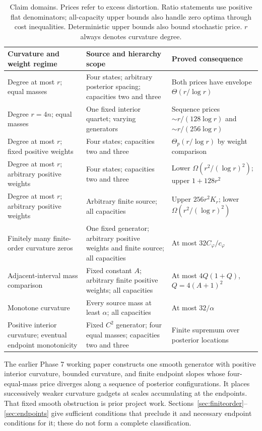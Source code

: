 \documentclass[11pt]{article}
\theoremstyle{definition}\newtheorem{definition}[theorem]{Definition}
\theoremstyle{remark}\newtheorem{remark}[theorem]{Remark}
\begin{document}
\begin{table}[ht]
\centering\small
\begin{tabular}{@{}>{\raggedright\arraybackslash}p{}>{\raggedright\arraybackslash}p{}>{\raggedright\arraybackslash}p{}@{}}
\toprule
Curvature and weight regime & Source and hierarchy scope & Proved consequence \\
\midrule
Degree at most $r$; equal masses & Four states; arbitrary posterior spacing; capacities two and three & Both prices have envelope $\Theta(r/\log r)$ \\
Degree $r=4n$; equal masses & One fixed interior quartet; varying generators & Sequence prices $\sim r/(128\log r)$ and $\sim r/(256\log r)$ \\
Degree at most $r$; fixed positive weights & Four states; capacities two and three & $\Theta_p(r/\log r)$ by weight comparison \\
Degree at most $r$; arbitrary positive weights & Four states; capacities two and three & Lower $\Omega(r^2/(\log r)^2)$; upper $1+128r^2$ \\
Degree at most $r$; arbitrary positive weights & Arbitrary finite source; all capacities & Upper $256r^2K_r$; lower $\Omega(r^2/(\log r)^2)$ \\
Finitely many finite-order curvature zeros & One fixed generator; arbitrary positive weights and finite source; all capacities & At most $32C_\varphi/c_\varphi$ \\
Adjacent-interval mass comparison & Fixed constant $A$; arbitrary finite positive weights; all capacities & At most $4Q(1+Q)$, $Q=4(A+1)^2$ \\
Monotone curvature & Every source mass at least $\alpha$; all capacities & At most $32/\alpha$ \\
Positive interior curvature; eventual endpoint monotonicity & Fixed $C^2$ generator; four equal masses; capacities two and three & Finite supremum over posterior locations \\
\bottomrule
\end{tabular}
\caption{Claim domains. Prices refer to excess distortion. Ratio statements use positive flat denominators; all-capacity upper bounds also handle zero optima through cost inequalities. Deterministic upper bounds also bound stochastic price. $r$ always denotes curvature degree.}
\label{tab:scope}
\end{table}

The earlier Phase 7 working paper \cite[Section 4]{huang7} constructs one smooth generator with positive interior curvature, bounded curvature, and finite endpoint slopes whose four-equal-mass price diverges along a sequence of posterior configurations. It places successively weaker curvature gadgets at scales accumulating at the endpoints. That fixed smooth obstruction is prior project work. Sections~\ref{sec:finiteorder}--\ref{sec:endpoints} give sufficient conditions that preclude it and necessary endpoint conditions for it; these do not form a complete classification.
\end{document}
